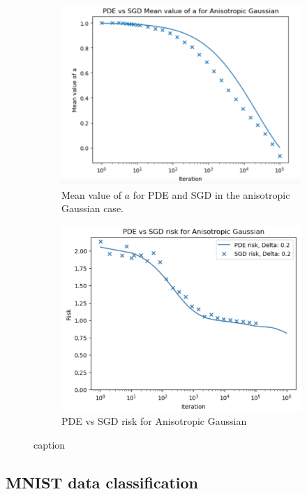 \documentclass{article}
\begin{document}
     \begin{figure}[H]
 \begin{subfigure}{0.5\textwidth}
   \centering
   \includegraphics[width=0.8\linewidth]{images/NGuyen2018-pde-sgd-gauss-anisotropic.png}
   \caption{Mean value of $ a$ for PDE and SGD in the anisotropic Gaussian case.}
   \label{fig: val a anisotropic}
 \end{subfigure}%
 \begin{subfigure}{0.5\textwidth}
   \centering
   \includegraphics[width=0.8\linewidth]{images/NGuyen2018-pde-sgd-risk-gauss-anisotropic.png}
   \caption{PDE vs SGD risk for Anisotropic Gaussian}
   \label{fig: risk anisotropic}
 \end{subfigure}
 \caption{ caption}
 \label{fig: anisotropic gaussian case plots}
 \end{figure} 

\subsection{MNIST data classification}
\end{document}
